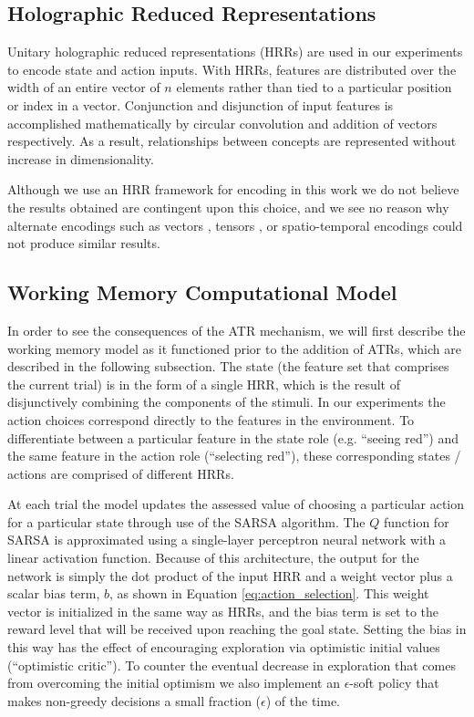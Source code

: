 \documentclass[10pt,letterpaper]{article}
\begin{document}
\subsection{Holographic Reduced Representations}
\label{sec:hrr}

Unitary holographic reduced representations (HRRs) \cite{plate_holographic_1995} are used in our experiments to encode state and action inputs. With HRRs, features are distributed over the width of an entire vector of $ n $ elements rather than tied to a particular position or index in a vector. Conjunction and disjunction of input features is accomplished mathematically by circular convolution and addition of vectors respectively. As a result, relationships between concepts are represented without increase in dimensionality. 

Although we use an HRR framework for encoding in this work we do not believe the results obtained are contingent upon this choice, and we see no reason why alternate encodings such as vectors \cite{mitchell_composition_2010}, tensors \cite{papalexakis_tensors_2016}, or spatio-temporal encodings \cite{hummel_distributed_1997} could not produce similar results.

\subsection{Working Memory Computational Model}

In order to see the consequences of the ATR mechanism, we will first describe the working memory model as it functioned prior to the addition of ATRs, which are described in the following subsection. The state (the feature set that comprises the current trial) is in the form of a single HRR, which is the result of disjunctively combining the components of the stimuli. In our experiments the action choices correspond directly to the features in the environment. To differentiate between a particular feature in the state role (e.g. ``seeing red'') and the same feature in the action role (``selecting red''), these corresponding states / actions are comprised of different HRRs.

At each trial the model updates the assessed value of choosing a particular action for a particular state through use of the SARSA algorithm. The $ Q $ function for SARSA is approximated using a single-layer perceptron neural network with a linear activation function. Because of this architecture, the output for the network is simply the dot product of the input HRR and a weight vector plus a scalar bias term, $b$, as shown in Equation \ref{eq:action_selection}. This weight vector is initialized in the same way as HRRs, and the bias term is set to the reward level that will be received upon reaching the goal state. Setting the bias in this way has the effect of encouraging exploration via optimistic initial values (``optimistic critic''). To counter the eventual decrease in exploration that comes from overcoming the initial optimism we also implement an $ \epsilon $-soft policy that makes non-greedy decisions a small fraction ($\epsilon$) of the time.  
\end{document}
